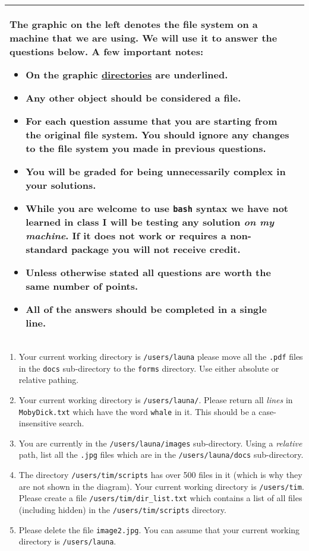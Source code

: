 \documentclass[11pt]{article}
\begin{document}
\begin{table}[h]
\begin{tabular}{|p{}|p{}|}
\begin{minipage}[t]{0.55\textwidth}
The graphic on the left denotes the file system on a machine that we are using. We will use it to answer the questions below. A few important notes:
\begin{itemize}
    \item On the graphic \underline{directories} are underlined.
    \item Any other object should be considered a file.
    \item \textbf{For each question assume that you are starting from the original file system}. You should ignore any changes to the file system you made in previous questions.
    \item You will be graded for being unnecessarily complex in your solutions. 
    \item While you are welcome to use \texttt{bash} syntax we have not learned in class I will be testing any solution \emph{on my machine}. If it does not work or requires a non-standard package you will not receive credit.
    \item Unless otherwise stated all questions are worth the same number of points.
    \item All of the answers should be completed in a single line.
\end{itemize}
\end{minipage}
\\
\hline
\end{tabular}
\end{table}

\begin{enumerate}

\item Your current working directory is \texttt{/users/launa} please move all the \texttt{.pdf} files in the \texttt{docs} sub-directory to the \texttt{forms} directory. Use either absolute or relative pathing.
\vspace{1.25cm}
\item Your current working directory is \texttt{/users/launa/}. Please return all \emph{lines} in \texttt{MobyDick.txt} which have the word \texttt{whale} in it. This should be a case-insensitive search.
\vspace{1.25cm}
\item You are currently in the \texttt{/users/launa/images} sub-directory. Using a \emph{relative} path, list all the \texttt{.jpg} files which are in the \texttt{/users/launa/docs} sub-directory.
\vspace{1.25cm}
\item The directory \texttt{/users/tim/scripts} has over 500 files in it (which is why they are not shown in the diagram). Your current working directory is \texttt{/users/tim}. Please create a file \texttt{/users/tim/dir\_list.txt} which contains a list of all files (including hidden) in the \texttt{/users/tim/scripts} directory.
\vspace{1.25cm}
\item Please delete the file \texttt{image2.jpg}. You can assume that your current working directory is \texttt{/users/launa}.


\end{enumerate}
\end{document}
